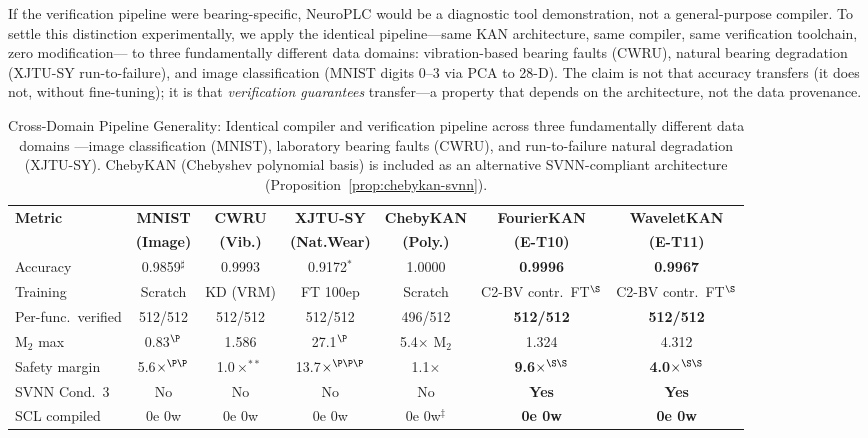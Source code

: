 \documentclass[journal,onecolumn]{IEEEtran}
\begin{document}
If the verification pipeline were bearing-specific, NeuroPLC would be a
diagnostic tool demonstration, not a general-purpose compiler. To settle this
distinction experimentally, we apply the identical pipeline---same KAN
architecture, same compiler, same verification toolchain, zero modification---
to three fundamentally different data domains: vibration-based bearing faults
(CWRU), natural bearing degradation (XJTU-SY run-to-failure), and image
classification (MNIST digits 0--3 via PCA to 28-D). The claim is not that
accuracy transfers (it does not, without fine-tuning); it is that
\textit{verification guarantees} transfer---a property that depends on the
architecture, not the data provenance.

\begin{table}[tb]
\centering
\caption{Cross-Domain Pipeline Generality: Identical compiler and
verification pipeline across three fundamentally different data domains
---image classification (MNIST), laboratory bearing faults (CWRU), and
run-to-failure natural degradation (XJTU-SY). ChebyKAN (Chebyshev
polynomial basis) is included as an alternative SVNN-compliant
architecture (Proposition~\ref{prop:chebykan-svnn}).}
\label{tab:cross_domain}
\footnotesize
\begin{tabular}{@{}lcccccc@{}}
\toprule
\textbf{Metric} & \textbf{MNIST} & \textbf{CWRU} & \textbf{XJTU-SY} & \textbf{ChebyKAN} & \textbf{FourierKAN} & \textbf{WaveletKAN} \\
 & \textbf{(Image)} & \textbf{(Vib.)} & \textbf{(Nat.Wear)} & \textbf{(Poly.)} & \textbf{(E-T10)} & \textbf{(E-T11)} \\
\midrule
 Accuracy & 0.9859$^{\sharp}$ & 0.9993 & 0.9172$^{*}$ & 1.0000 & \textbf{0.9996} & \textbf{0.9967} \\
 Training & Scratch & KD (VRM) & FT 100ep & Scratch & C2-BV contr.\ FT$^{\S}$ & C2-BV contr.\ FT$^{\S}$ \\
\midrule
 Per-func.\ verified & 512/512 & 512/512 & 512/512 & 496/512 & \textbf{512/512} & \textbf{512/512} \\
 M$_2$ max & 0.83$^{\P}$ & 1.586 & 27.1$^{\P}$ & 5.4$\times$ M$_2$ & 1.324 & 4.312 \\
 Safety margin & 5.6$\times^{\P\P}$ & 1.0$\times^{**}$ & 13.7$\times^{\P\P\P}$ & 1.1$\times$ & \textbf{9.6$\times^{\S\S}$} & \textbf{4.0$\times^{\S\S}$} \\
 SVNN Cond.~3 & No & No & No & No & \textbf{Yes} & \textbf{Yes} \\
 SCL compiled & 0e 0w & 0e 0w & 0e 0w & 0e 0w$^{\ddag}$ & \textbf{0e 0w} & \textbf{0e 0w} \\

\end{tabular}
\end{table}
\end{document}
